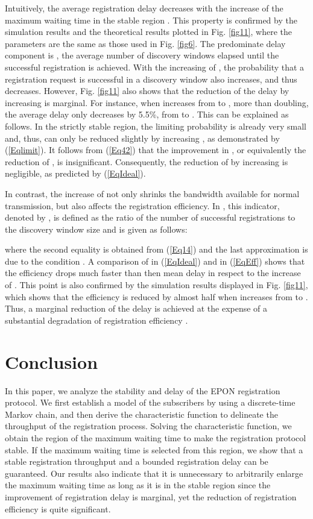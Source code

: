 \documentclass[journal]{IEEEtran}
\begin{document}
Intuitively, the average registration delay  decreases with the increase of the maximum waiting time  in the stable region . This property is confirmed by the simulation results and the theoretical results plotted in Fig. \ref{fig11}, where the parameters are the same as those used in Fig. \ref{fig6}. The predominate delay component is , the average number of discovery windows elapsed until the successful registration is achieved. With the increasing of , the probability  that a registration request is successful in a discovery window also increases, and thus  decreases. However, Fig. \ref{fig11} also shows that the reduction of the delay by increasing  is marginal. For instance, when  increases from  to , more than doubling, the average delay  only decreases by 5.5\%, from  to . This can be explained as follows. In the strictly stable region, the limiting probability  is already very small and, thus, can only be reduced slightly by increasing , as demonstrated by (\ref{Eqlimit}). It follows from (\ref{Eq42}) that the improvement in , or equivalently the reduction of , is insignificant. Consequently, the reduction of  by increasing  is negligible, as predicted by (\ref{EqIdeal}).

In contrast, the increase of  not only shrinks the bandwidth available for normal transmission, but also affects the registration efficiency. In \cite{1kramer2005,9cui2012throughput}, this indicator, denoted by , is defined as the ratio of the number of successful registrations to the discovery window size and is given as follows:

where the second equality is obtained from (\ref{Eq14}) and the last approximation is due to the condition . A comparison of  in (\ref{EqIdeal}) and  in (\ref{EqEff}) shows that the efficiency  drops much faster than then mean delay  in respect to the increase of . This point is also confirmed by the simulation results displayed in Fig. \ref{fig11}, which shows that the efficiency  is reduced by almost half when  increases from  to . Thus, a marginal reduction of the delay is achieved at the expense of a substantial degradation of registration efficiency .

\section{Conclusion}\label{conclusion}

In this paper, we analyze the stability and delay of the EPON registration protocol. We first establish a model of the subscribers by using a discrete-time Markov chain, and then derive the characteristic function to delineate the throughput of the registration process. Solving the characteristic function, we obtain the region of the maximum waiting time to make the registration protocol stable. If the maximum waiting time is selected from this region, we show that a stable registration throughput and a bounded registration delay can be guaranteed. Our results also indicate that it is unnecessary to arbitrarily enlarge the maximum waiting time as long as it is in the stable region since the improvement of registration delay is marginal, yet the reduction of registration efficiency is quite significant.
\end{document}
